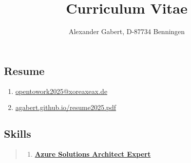 \documentclass[a4paper]{report}
\begin{document}
\title{Curriculum Vitae}
\author{Alexander Gabert, D-87734 Benningen}
\maketitle

\begin{flushleft}
\section*{Resume}
\end{flushleft}

\begin{enumerate}

\item[\textbf{Email}]
                \href{mailto://opentowork2025@xoreaxeax.de}
                {opentowork2025@xoreaxeax.de}

\item[\textbf{Current CV}]
                \href{https://agabert.github.io/resume2025.pdf}
                {agabert.github.io/resume2025.pdf}

\end{enumerate}

\subsection*{Skills}

\begin{quote}
\begin{enumerate}

\item[AZ-305]
                    \href{https://learn.microsoft.com/en-us/users/alexandergabertaz104-2320/credentials/8593ddd9c32f58a5}
                    {\textbf{Azure Solutions Architect Expert}}

\begin{flushleft}

\end{flushleft}

\end{enumerate}
\end{quote}
\end{document}

